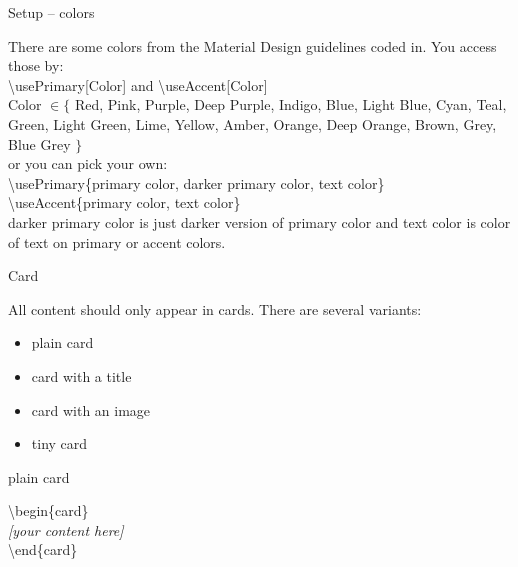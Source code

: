 \documentclass[aspectratio=43]{beamer}
\begin{document}
\begin{frame}{Setup -- colors}
\begin{card}
There are some colors from the Material Design guidelines coded in. You access those by: \\[2mm]
{\color{primary} \textbackslash usePrimary[Color]} and {\color{primary}\textbackslash useAccent[Color]}\\[2mm]
{\tiny {\color{primary}Color} $\in \{$ Red, Pink, Purple, Deep Purple, Indigo, Blue, Light Blue, Cyan, Teal, Green, Light Green, Lime, Yellow, Amber, Orange, Deep Orange, Brown, Grey, Blue Grey $\}$} \\[2mm]
or you can pick your own:\\[2mm]
{\color{primary} \textbackslash usePrimary\{primary color, darker primary color, text color\}}
{\color{primary} \textbackslash useAccent\{primary color, text color\}}\\[2mm]
{\color{primary} darker primary color} is just darker version of {\color{primary} primary color} and {\color{primary} text color} is color of text on {\color{primary} primary} or {\color{primary} accent colors}.
\end{card}
\end{frame}

\begin{frame}{Card}
\begin{card}
All content should only appear in cards. There are several variants:
\begin{itemize}
\item plain card
\item card with a title
\item card with an image
\item tiny card
\end{itemize}
\end{card}
\end{frame}

\begin{frame}{plain card}
\begin{card}
\end{card}

\begin{card}
{\color{primary} \textbackslash begin\{card\}\\[2mm]}
\null\qquad \textit{[your content here]}\\[2mm]
{\color{primary} \textbackslash end\{card\}}
\end{card}
\end{frame}
\end{document}
